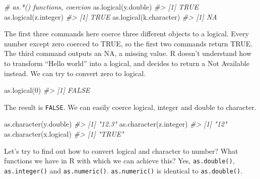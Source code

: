 \documentclass[
]{book}
\newenvironment{Shaded}{\begin{snugshade}}{\end{snugshade}}
\newcommand{\CommentTok}[1]{\textcolor[rgb]{0.56,0.35,0.01}{\textit{#1}}}
\newcommand{\DecValTok}[1]{\textcolor[rgb]{0.00,0.00,0.81}{#1}}
\newcommand{\FunctionTok}[1]{\textcolor[rgb]{0.00,0.00,0.00}{#1}}
\newcommand{\NormalTok}[1]{#1}
\begin{document}
\begin{Shaded}
\begin{Highlighting}[]
\CommentTok{\# as.*() functions, coercion}
\FunctionTok{as.logical}\NormalTok{(y.double)}
\CommentTok{\#\textgreater{} [1] TRUE}
\FunctionTok{as.logical}\NormalTok{(z.integer)}
\CommentTok{\#\textgreater{} [1] TRUE}
\FunctionTok{as.logical}\NormalTok{(k.character)}
\CommentTok{\#\textgreater{} [1] NA}
\end{Highlighting}
\end{Shaded}

The first three commands here coerce three different objects to a logical. Every number except zero coerced to TRUE, so the first two commands return TRUE. The third command outputs an NA, a missing value. R doesn't understand how to transform ``Hello world'' into a logical, and decides to return a Not Available instead.
We can try to convert zero to logical.

\begin{Shaded}
\begin{Highlighting}[]
\FunctionTok{as.logical}\NormalTok{(}\DecValTok{0}\NormalTok{)}
\CommentTok{\#\textgreater{} [1] FALSE}
\end{Highlighting}
\end{Shaded}

The result is \texttt{FALSE}. We can easily coerce logical, integer and double to character.

\begin{Shaded}
\begin{Highlighting}[]
\FunctionTok{as.character}\NormalTok{(y.double)}
\CommentTok{\#\textgreater{} [1] "12.3"}
\FunctionTok{as.character}\NormalTok{(z.integer)}
\CommentTok{\#\textgreater{} [1] "12"}
\FunctionTok{as.character}\NormalTok{(x.logical)}
\CommentTok{\#\textgreater{} [1] "TRUE"}
\end{Highlighting}
\end{Shaded}

Let's try to find out how to convert logical and character to number? What functions we have in R with which we can achieve this? Yes, \texttt{as.double()}, \texttt{as.integer()} and \texttt{as.numeric()}. \texttt{as.numeric()} is identical to \texttt{as.double()}.
\end{document}
